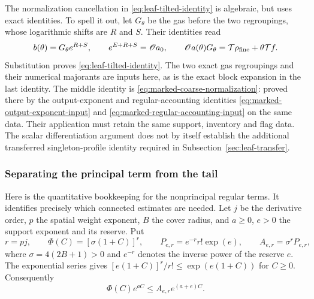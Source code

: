 The normalization cancellation in \eqref{eq:leaf-tilted-identity}
is algebraic, but uses exact identities. To spell it out, let $G_\theta$
be the gas before the two regroupings, whose logarithmic shifts are
$R$ and $S$. Their identities read
\[
 b(\theta)=G_\theta e^{R+S},\qquad
 e^{E+R+S}=\mathscr O a_0,\qquad
 \mathscr O a(\theta)G_\theta=\mathcal T\rho_{\rm fine}+\theta\mathcal T f.
\]
Substitution proves \eqref{eq:leaf-tilted-identity}. The two exact gas regroupings and their numerical majorants are
inputs here, as is the exact block expansion in the last identity.
The middle identity is \eqref{eq:marked-coarse-normalization}:
proved there by the output-exponent and regular-accounting identities
\eqref{eq:marked-output-exponent-input} and
\eqref{eq:marked-regular-accounting-input} on the same data.
Their application must retain the same support, inventory and flag
data. The scalar differentiation argument does not
by itself establish the additional transferred singleton-profile
identity required in Subsection~\ref{sec:leaf-transfer}.

\subsubsection{Separating the principal term from the tail}
Here is the quantitative bookkeeping for the nonprincipal regular
terms. It identifies precisely which connected estimates are needed.
Let $j$ be the derivative order, $p$ the spatial weight exponent,
$B$ the cover radius, and $a\ge0$, $e>0$ the support exponent and its
reserve. Put
\[
 r=pj,\qquad \Phi(C)=[\sigma(1+C)]^r,\qquad
 P_{e,r}=e^{-r}r!\exp(e),\qquad
                          A_{e,r}=\sigma^r P_{e,r},
\]
where $\sigma=4(2B+1)>0$ and $e^{-r}$ denotes the inverse power of
the reserve $e$. The exponential series gives
$[e(1+C)]^r/r!\le\exp(e(1+C))$ for $C\ge0$. Consequently
\begin{equation}\label{eq:leaf-polynomial-reserve}
                 \Phi(C)e^{aC}\le A_{e,r}e^{(a+e)C}.
\end{equation}


